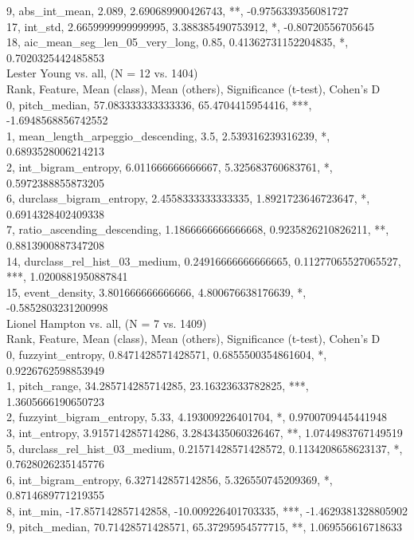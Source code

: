 9, abs_int_mean, 2.089, 2.690689900426743, **, -0.9756339356081727\\
17, int_std, 2.6659999999999995, 3.388385490753912, *, -0.80720556705645\\
18, aic_mean_seg_len_05_very_long, 0.85, 0.41362731152204835, *, 0.7020325442485853\\
Lester Young vs. all, (N = 12 vs. 1404)\\
Rank, Feature, Mean (class), Mean (others), Significance (t-test), Cohen's D\\
0, pitch_median, 57.083333333333336, 65.4704415954416, ***, -1.6948568856742552\\
1, mean_length_arpeggio_descending, 3.5, 2.539316239316239, *, 0.6893528006214213\\
2, int_bigram_entropy, 6.011666666666667, 5.325683760683761, *, 0.5972388855873205\\
6, durclass_bigram_entropy, 2.4558333333333335, 1.8921723646723647, *, 0.6914328402409338\\
7, ratio_ascending_descending, 1.1866666666666668, 0.9235826210826211, **, 0.8813900887347208\\
14, durclass_rel_hist_03_medium, 0.24916666666666665, 0.11277065527065527, ***, 1.0200881950887841\\
15, event_density, 3.801666666666666, 4.800676638176639, *, -0.5852803231200998\\
Lionel Hampton vs. all, (N = 7 vs. 1409)\\
Rank, Feature, Mean (class), Mean (others), Significance (t-test), Cohen's D\\
0, fuzzyint_entropy, 0.8471428571428571, 0.6855500354861604, *, 0.9226762598853949\\
1, pitch_range, 34.285714285714285, 23.16323633782825, ***, 1.3605666190650723\\
2, fuzzyint_bigram_entropy, 5.33, 4.193009226401704, *, 0.9700709445441948\\
3, int_entropy, 3.915714285714286, 3.2843435060326467, **, 1.0744983767149519\\
5, durclass_rel_hist_03_medium, 0.21571428571428572, 0.1134208658623137, *, 0.7628026235145776\\
6, int_bigram_entropy, 6.327142857142856, 5.326550745209369, *, 0.8714689771219355\\
8, int_min, -17.857142857142858, -10.009226401703335, ***, -1.4629381328805902\\
9, pitch_median, 70.71428571428571, 65.37295954577715, **, 1.069556616718633\\
